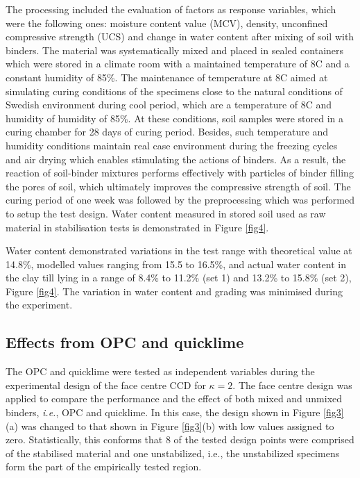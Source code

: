 \documentclass[eprint,
]{actapoly}
\begin{document}
The processing included the evaluation of factors as response variables, which were the following ones: moisture content value (MCV), density, unconfined compressive strength (UCS) and change in water content after mixing of soil with binders. The material was systematically mixed and placed in sealed containers which were stored in a climate room with a maintained temperature of 8\degree C and a constant humidity of 85\%. The maintenance of temperature at 8\degree C aimed at simulating curing conditions of the specimens close to the natural conditions of Swedish environment during cool period, which are a temperature of 8\degree C and humidity of humidity of 85\%. At these conditions, soil samples were stored in a curing chamber for 28 days of curing period. Besides, such temperature and humidity conditions maintain real case environment during the freezing cycles and air drying which enables stimulating the actions of binders. As a result, the reaction of soil-binder mixtures performs effectively with particles of binder filling the pores of soil, which ultimately improves the compressive strength of soil. The curing period of one week was followed by the preprocessing which was performed to setup the test design. Water content measured in stored soil used as raw material in stabilisation tests is demonstrated in Figure \ref{fig4}. 

Water content demonstrated variations in the test range with theoretical value at 14.8\%, modelled values ranging from 15.5 to 16.5\%, and actual water content in the clay till lying in a range of 8.4\% to 11.2\% (set 1) and 13.2\% to 15.8\% (set 2), Figure \ref{fig4}. The variation in water content and grading was minimised during the experiment.

\subsection{Effects from OPC and quicklime}
The OPC and quicklime were tested as independent variables during the  experimental design of the face centre CCD for $\kappa=2$. The face centre design was applied to compare the performance and the effect of both mixed and unmixed binders, \emph{i.e.}, OPC and quicklime. In this case, the design shown in Figure \ref{fig3}(a) was changed to that shown in Figure \ref{fig3}(b) with low values assigned to zero. Statistically, this conforms that 8 of the tested design points were comprised of the stabilised material and one unstabilized, i.e., the unstabilized specimens form the part of the empirically tested region. 
\end{document}
